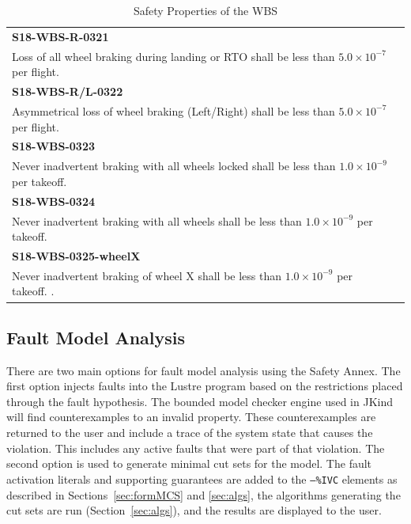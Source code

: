 \begin{table}[htbp]
\begin{center}
\begin{tabular}{@{}ll}
\toprule
\textbf{S18-WBS-R-0321} \\Loss of all wheel braking during landing or RTO shall be less than $5.0 \times 10^{-7}$ per flight.                                    \\ \midrule 
\textbf{S18-WBS-R/L-0322}  \\ Asymmetrical loss of wheel braking (Left/Right) shall be less than $5.0 \times 10^{-7}$ per flight. \\ \midrule
\textbf{S18-WBS-0323} \\ Never inadvertent braking with all wheels locked shall be less than $1.0 \times 10^{-9}$ per takeoff.                                                                                                                                                                                                               \\ \midrule
\textbf{S18-WBS-0324}  \\ Never inadvertent braking with all wheels shall be less than $1.0 \times 10^{-9}$ per takeoff.                                                                                                            \\ \midrule
\textbf{S18-WBS-0325-wheelX} \\ Never inadvertent braking of wheel X shall be less than $1.0 \times 10^{-9}$ per takeoff.                                                                                                           .                                                                                                                 \\ \bottomrule
\end{tabular}
\caption{Safety Properties of the WBS}
\label{tab:safetyProperties}
\end{center} 
\end{table} 


\subsection{Fault Model Analysis}
There are two main options for fault model analysis using the Safety Annex. The first option injects faults into the Lustre program based on the restrictions placed through the fault hypothesis. The bounded model checker engine used in JKind will find counterexamples to an invalid property. These counterexamples are returned to the user and include a trace of the system state that causes the violation. This includes any active faults that were part of that violation. The second option is used to generate minimal cut sets for the model. The fault activation literals and supporting guarantees are added to the \texttt{--\%IVC} elements as described in Sections~\ref{sec:formMCS} and \ref{sec:algs}, the algorithms generating the cut sets are run (Section~\ref{sec:algs}), and the results are displayed to the user. 

